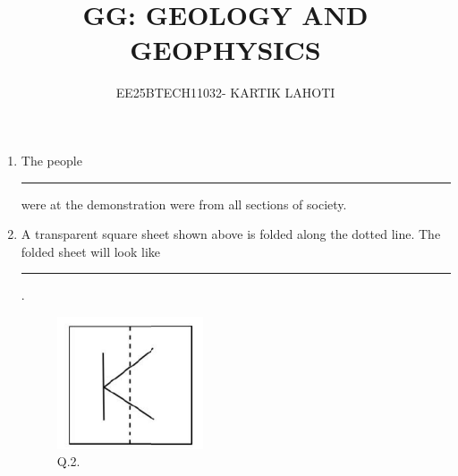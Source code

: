 \documentclass[journal,12pt,onecolumn]{IEEEtran}
\title{GG: GEOLOGY AND GEOPHYSICS}
\author{EE25BTECH11032- KARTIK LAHOTI}
\theoremstyle{remark}
\begin{document}
\maketitle

\begin{enumerate}

\centering\section*{General Aptitude - GA }

\subsection*{Q.1. - Q.5 Multiple Choice Question (MCQ), carry ONE mark each(for each wrong answer: -1/3).}
    
    \item The people \rule{3cm}{0.15mm} were at the demonstration were from all sections of society. \hfill{}
        \begin{enumerate}
        \end{enumerate}
    
    \item A transparent square sheet shown above is folded along the dotted line. The folded sheet will look like \rule{3cm}{0.15mm}.\hfill{}
        \begin{figure}[h]
            \centering            
            \includegraphics[width=0.2\columnwidth]{Figs/fig_1.png}
            \caption{Q.2.}
            \label{fig:q2}
        \end{figure}
    

\end{enumerate}
\end{document}
